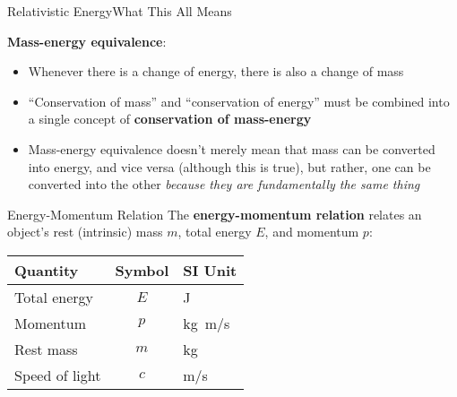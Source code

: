 \documentclass[12pt,compress,aspectratio=169]{beamer}
\newcommand{\eq}[2]{\vspace{#1}{\Large\begin{displaymath}#2\end{displaymath}}}
\begin{document}
\begin{frame}{Relativistic Energy}{What This All Means}
  
  \eq{-.2in}{
    \boxed{E=mc^2}
  }

  \textbf{Mass-energy equivalence}:
  \begin{itemize}
  \item Whenever there is a change of energy, there is also a change of mass
  \item ``Conservation of mass'' and ``conservation of energy'' must be
    combined into a single concept of \textbf{conservation of mass-energy}
  \item Mass-energy equivalence doesn't merely mean that mass can be converted
    into energy, and vice versa (although this is true), but rather, one can be
    converted into the other
    \emph{because they are fundamentally the same thing}
  \end{itemize}
\end{frame}






\begin{frame}{Energy-Momentum Relation}
  The \textbf{energy-momentum relation} relates an object's rest (intrinsic)
  mass $m$, total energy $E$, and momentum $p$:

  \eq{-.2in}{
    \boxed{E^2=p^2c^2+m^2c^4}
  }
  \begin{center}
    \begin{tabular}{l|c|l}
      \rowcolor{pink}
      \textbf{Quantity} & \textbf{Symbol} & \textbf{SI Unit} \\ \hline
      Total energy   & $E$ & \si{\joule} \\
      Momentum       & $p$ & \si{\kilo\gram.\metre/\second}\\
      Rest mass      & $m$ & \si{\kilo\gram} \\
      Speed of light & $c$ & \si{\metre/\second}
    \end{tabular}
  \end{center}
\end{frame}
\end{document}

